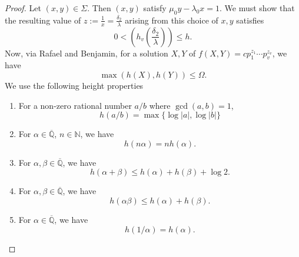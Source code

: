 \begin{proof}
Let $(x,y) \in \Sigma$. Then $(x,y)$ satisfy $\mu_0y-\lambda_0x=1$. We must show that the resulting value of $z:= \frac{1}{x} = \frac{\delta_2}{\lambda}$ arising from this choice of $x,y$ satisfies
\[0 < \left(h_v\left(\frac{\delta_2}{\lambda}\right)\right)\leq h.\]
Now, via Rafael and Benjamin, for a solution $X,Y$ of $f(X,Y) = c p_1^{z_1}\cdots p_v^{z_v}$, we have
\[\max(h(X),h(Y)) \leq \Omega.\]
We use the following height properties
\begin{enumerate}
\item For a non-zero rational number $a/b$ where $\gcd(a,b) = 1$,
\[h(a/b) = \max \{\log{|a|}, \log{|b|}\}\]
\item For $\alpha \in \overline{\mathbb{Q}}$, $n \in \mathbb{N}$, we have
\[h(n \alpha) = n h(\alpha).\]
\item For $\alpha, \beta \in \overline{\mathbb{Q}}$, we have
\[h(\alpha + \beta) \leq h(\alpha) + h(\beta) + \log{2}.\]
\item For $\alpha, \beta \in \overline{\mathbb{Q}}$, we have
\[h(\alpha\beta) \leq h(\alpha) + h(\beta).\]
\item For $\alpha \in \overline{\mathbb{Q}}$, we have
\[h(1/\alpha) = h(\alpha).\]
\end{enumerate}


\end{proof}
